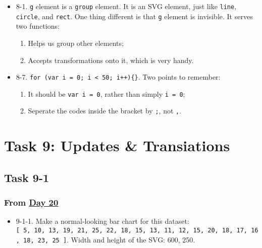\documentclass[
]{book}
\providecommand{\tightlist}{%
  \setlength{\itemsep}{0pt}\setlength{\parskip}{0pt}}
\begin{document}
\begin{itemize}
\item
  8-1. \texttt{g} element is a \texttt{group} element. It is an SVG element, just like \texttt{line}, \texttt{circle}, and \texttt{rect}. One thing different is that \texttt{g} element is invisible. It serves two functions:

  \begin{enumerate}
  \def\labelenumi{\arabic{enumi}.}
  \item
    Helps us group other elements;
  \item
    Accepts transformations onto it, which is very handy.
  \end{enumerate}
\item
  8-7. \texttt{for\ (var\ i\ =\ 0;\ i\ \textless{}\ 50;\ i++)\{\}}. Two points to remember:

  \begin{enumerate}
  \def\labelenumi{\arabic{enumi}.}
  \item
    It should be \texttt{var\ i\ =\ 0}, rather than simply \texttt{i\ =\ 0};
  \item
    Seperate the codes inside the bracket by \texttt{;}, not \texttt{,}.
  \end{enumerate}
\end{itemize}

\hypertarget{task9}{%
\chapter{Task 9: Updates \& Transiations}\label{task9}}

\hypertarget{task-9-1}{%
\section{Task 9-1}\label{task-9-1}}

\hypertarget{from-day-20}{%
\subsection{\texorpdfstring{From \href{https://observablehq.com/@hongtaoh/day-twenty-task-8-continued-2020-09-13}{Day 20}}{From Day 20}}\label{from-day-20}}

\begin{itemize}
\tightlist
\item
  9-1-1. Make a normal-looking bar chart for this dataset: \texttt{{[}\ 5,\ 10,\ 13,\ 19,\ 21,\ 25,\ 22,\ 18,\ 15,\ 13,\ 11,\ 12,\ 15,\ 20,\ 18,\ 17,\ 16,\ 18,\ 23,\ 25\ {]}}. Width and height of the SVG: 600, 250.
\end{itemize}
\end{document}
